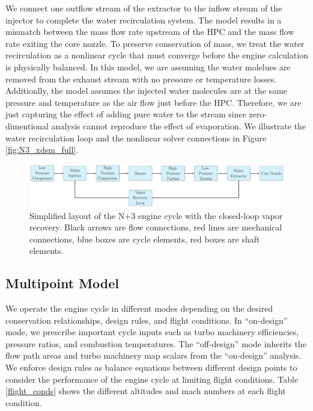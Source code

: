 \documentclass[conf]{new-aiaa}
\begin{document}
We connect one outflow stream of the extractor to the inflow stream of the injector to complete the water recirculation system.
The model results in a mismatch between the mass flow rate upstream of the HPC and the mass flow rate exiting the core nozzle.
To preserve conservation of mass, we treat the water recirculation as a nonlinear cycle that must converge before the engine calculation is physically balanced.
In this model, we are assuming the water molelues are removed from the exhaust stream with no pressure or temperature losses.
Additionlly, the model assumes the injected water molecules are at the same pressure and temperature as the air flow just before the HPC.
Therefore, we are just capturing the effect of adding pure water to the stream since zero-dimentional analysis cannot reproduce the effect of evaporation.
We illustrate the water recirculation loop and the nonlinear solver connections in Figure \ref{fig:N3_xdsm_full}.

\begin{figure}[hbt!]
    \centering
    \includegraphics[width=1.0\textwidth]{N3_CLVR_cycle.pdf}
    \caption{
        Simplified layout of the N+3 engine cycle with the closed-loop vapor recovery.
        Black arrows are flow connections, red lines are mechanical connections, blue boxes are cycle elements, red boxes are shaft elements.
    }
    \label{fig:n3_clvr}
\end{figure}

\subsection{Multipoint Model}
We operate the engine cycle in different modes depending on the desired conservation relationships, design rules, and flight conditions.
In ``on-design'' mode, we prescribe important cycle inputs such as turbo machinery efficiencies, pressure ratios, and combustion temperatures.
The ``off-design'' mode inherits the flow path areas and turbo machinery map scalars from the ``on-design'' analysis.
We enforce design rules as balance equations between different design points to consider the performance of the engine cycle at limiting flight conditions.
Table \ref{flight_conds} shows the different altitudes and mach numbers at each flight condition.
\end{document}
